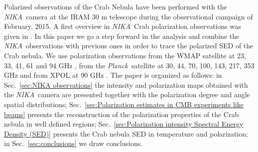 \documentclass[twocolumn,traditabstract]{aa}
\def\NIKA{\textit{NIKA}}
\def\Planck{\textit{Planck}}
\begin{document}
Polarized observations of the Crab Nebula have been performed with the \NIKA\ camera \citep{monfardini2010,catalano2014,monfardini2014} at the IRAM 30 m telescope during the observational campaign of February, 2015. A first overview in \NIKA\ Crab polarization observations was given in \cite{2016JLTP..184..724R}. In this paper we go a step forward in the analysis and combine the \NIKA\ observations with previous ones
in order to trace the polarized SED of the Crab nebula. We use polarization observations from the WMAP satellite at 23, 33, 41, 61 and 94 GHz \citep{2011ApJS..192...19W}, from the \Planck\ satellite at 30, 44, 70, 100, 143, 217, 353 GHz and from XPOL at 90 GHz \citep{aumont2010}. 
 The paper is organized as follows: in Sec.~\ref{sec:NIKA observations} the intensity and polarization maps obtained with the \NIKA\ camera are presented together with the polarization degree and angle spatial distributions; Sec.~\ref{sec:Polarization estimates in CMB experiments like beams} presents the reconstruction of the polarization properties of the Crab nebula in well defined regions; Sec.~\ref{sec:Polarization intensity Spectral Energy Density (SED)} presents the Crab nebula SED in temperature and polarization; in Sec.~\ref{sec:conclusions} we draw conclusions.
\end{document}
